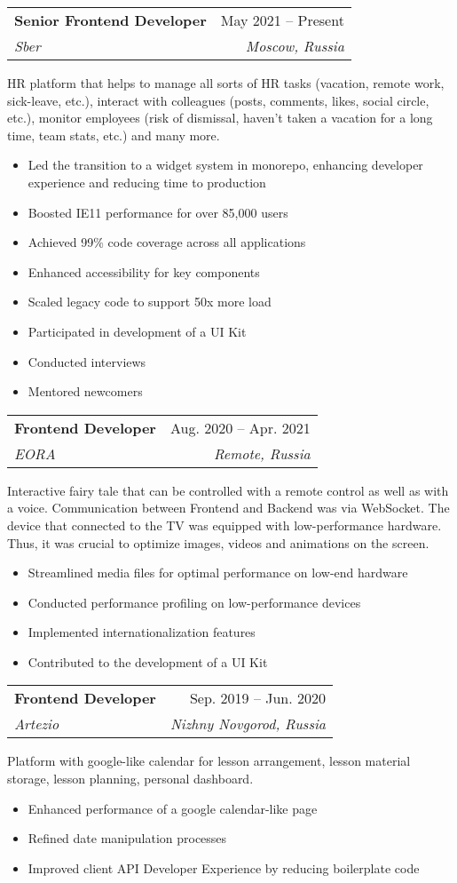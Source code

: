 \documentclass[letterpaper,11pt]{article}
\makeatletter
\newcommand{\resumeItem}[1]{
  \item\small{
    \begin{minipage}[t]{0.99\linewidth} %
      {#1}
    \end{minipage}
    \vspace{-2pt} %
  }
}
\newcommand{\resumeSubheading}[4]{
  \vspace{-2pt}\item
    \begin{tabular*}{0.97\textwidth}[t]{l@{\extracolsep{\fill}}r}
      \textbf{#1} & #2 \\
      \textit{\small#3} & \textit{\small #4} \\
    \end{tabular*}\vspace{-7pt}
}
\newcommand{\projectDescription}[1]{
    \vspace{8pt} %
    \small {#1}
    \vspace{-6pt} %
}
\newcommand{\resumeItemListStart}{\begin{itemize}}
\newcommand{\resumeItemListEnd}{\end{itemize}\vspace{-5pt}}
\makeatother
\begin{document}
    \resumeSubheading
      {Senior Frontend Developer}{May 2021 -- Present}
      {Sber}{Moscow, Russia}

    \projectDescription
      {HR platform that helps to manage all sorts of HR tasks (vacation, remote work, sick-leave, etc.), interact with colleagues (posts, comments, likes, social circle, etc.), monitor employees (risk of dismissal, haven't taken a vacation for a long time, team stats, etc.) and many more.}
        
      \resumeItemListStart
        \resumeItem{Led the transition to a widget system in monorepo, enhancing developer experience and reducing time to production}
        \resumeItem{Boosted IE11 performance for over 85,000 users}
        \resumeItem{Achieved 99\% code coverage across all applications}
        \resumeItem{Enhanced accessibility for key components}
        \resumeItem{Scaled legacy code to support 50x more load}
        \resumeItem{Participated in development of a UI Kit}
        \resumeItem{Conducted interviews}
        \resumeItem{Mentored newcomers}
      \resumeItemListEnd

    \resumeSubheading
      {Frontend Developer}{Aug. 2020 -- Apr. 2021}
      {EORA}{Remote, Russia}

    \projectDescription
      {Interactive fairy tale that can be controlled with a remote control as well as with a voice. Communication between Frontend and Backend was via WebSocket. The device that connected to the TV was equipped with low-performance hardware. Thus, it was crucial to optimize images, videos and animations on the screen.}

      \resumeItemListStart
        \resumeItem{Streamlined media files for optimal performance on low-end hardware}
        \resumeItem{Conducted performance profiling on low-performance devices}
        \resumeItem{Implemented internationalization features}
        \resumeItem{Contributed to the development of a UI Kit}
      \resumeItemListEnd

    \resumeSubheading
    {Frontend Developer}{Sep. 2019 -- Jun. 2020}
    {Artezio}{Nizhny Novgorod, Russia}
    
    \projectDescription
      {Platform with google-like calendar for lesson arrangement, lesson material storage, lesson planning, personal dashboard.}

    \resumeItemListStart
      \resumeItem{Enhanced performance of a google calendar-like page}
      \resumeItem{Refined date manipulation processes}
      \resumeItem{Improved client API Developer Experience by reducing boilerplate code}
    \resumeItemListEnd
\end{document}
